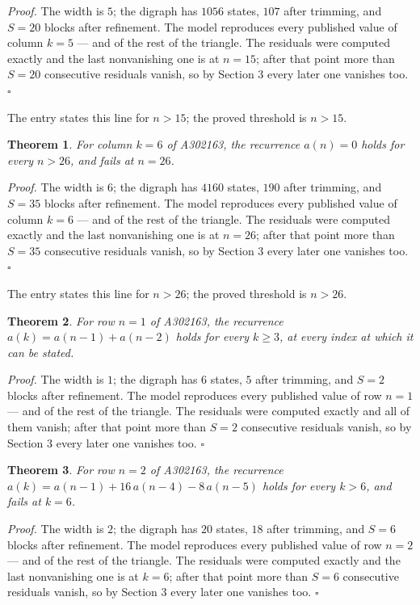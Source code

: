 \documentclass[11pt]{article}
\newtheorem{theorem}{Theorem}
\theoremstyle{definition}
\begin{document}
{\itshape Proof.} The width is $5$; the digraph has $1056$ states, $107$ after trimming, and $S = 20$ blocks after refinement. The model reproduces every published value of column $k = 5$ --- and of the rest of the triangle. The residuals were computed exactly and the last nonvanishing one is at $n = 15$; after that point more than $S = 20$ consecutive residuals vanish, so by Section 3 every later one vanishes too. $\square$

The entry states this line for $n > 15$; the proved threshold is $n > 15$.

\begin{theorem} For column $k = 6$ of A302163, the recurrence $a(n) = 0$ holds for every $n > 26$, and fails at $n = 26$.\end{theorem}

{\itshape Proof.} The width is $6$; the digraph has $4160$ states, $190$ after trimming, and $S = 35$ blocks after refinement. The model reproduces every published value of column $k = 6$ --- and of the rest of the triangle. The residuals were computed exactly and the last nonvanishing one is at $n = 26$; after that point more than $S = 35$ consecutive residuals vanish, so by Section 3 every later one vanishes too. $\square$

The entry states this line for $n > 26$; the proved threshold is $n > 26$.

\begin{theorem} For row $n = 1$ of A302163, the recurrence $a(k) = a(n-1) + a(n-2)$ holds for every $k \ge 3$, at every index at which it can be stated.\end{theorem}

{\itshape Proof.} The width is $1$; the digraph has $6$ states, $5$ after trimming, and $S = 2$ blocks after refinement. The model reproduces every published value of row $n = 1$ --- and of the rest of the triangle. The residuals were computed exactly and all of them vanish; after that point more than $S = 2$ consecutive residuals vanish, so by Section 3 every later one vanishes too. $\square$

\begin{theorem} For row $n = 2$ of A302163, the recurrence $a(k) = a(n-1) + 16\,a(n-4) - 8\,a(n-5)$ holds for every $k > 6$, and fails at $k = 6$.\end{theorem}

{\itshape Proof.} The width is $2$; the digraph has $20$ states, $18$ after trimming, and $S = 6$ blocks after refinement. The model reproduces every published value of row $n = 2$ --- and of the rest of the triangle. The residuals were computed exactly and the last nonvanishing one is at $k = 6$; after that point more than $S = 6$ consecutive residuals vanish, so by Section 3 every later one vanishes too. $\square$
\end{document}
